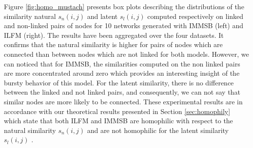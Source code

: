 Figure \ref{fig:homo_mustach} presents box plots describing  the distributions of the similarity natural $s_n(i,j)$ and latent $s_l(i,j)$ computed respectively on linked and non-linked pairs of nodes for 10 networks generated with IMMSB (left) and ILFM (right). The results have been aggregated over the four datasets.  It confirms that the natural similarity is  higher for  pairs of nodes which are connected than between nodes which are not linked for both models. However, we can noticed that for IMMSB, the similarities computed on the non linked pairs are more concentrated around zero which provides an interesting insight of the bursty behavior of this model. For the latent similarity,  there is no difference between the linked and not linked pairs, and consequently, we can not say that similar nodes are more likely to be connected. These experimental results are in accordance with our theoretical results presented in Section \ref{sec:homophily} which state that both ILFM and IMMSB are homophilic with respect to the natural similarity $s_n(i,j)$ and are not homophilic for the latent similarity $s_l(i,j)$ .
